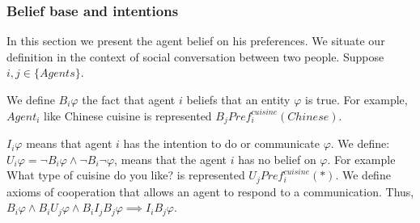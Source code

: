 \documentclass{llncs}
\begin{document}
\subsubsection{Belief base and intentions}
In this section we present the agent belief on his preferences. We situate our definition in the context of social conversation between two people. Suppose $i,j \in \{Agents\}$.


 We define $ B_{i} \varphi$ the fact that agent $i$  beliefs that an entity $\varphi$ is true. For example, $Agent_{i}$ like Chinese cuisine is represented $ B_{j} Pref_{i}^{cuisine}(Chinese)$.
 
  $I_{i} \varphi$ means that  agent $i$ has the intention to do or communicate $\varphi$. We define: $U_{i} \varphi = \neg B_{i} \varphi \land \neg B_{i} \neg \varphi$, means that the agent $i$ has no belief on $\varphi$. For example What type of cuisine do you like? is represented $U_{j} Pref_{i}^{cuisine}(*)$. We define axioms of cooperation that allows an agent to respond to a communication. Thus, $ B_{i} \varphi \land  B_{i} U_{j} \varphi \land  B_{i} I_{j}  B_{j} \varphi \implies I_{i}  B_{j} \varphi  $.
  
 
\end{document}
